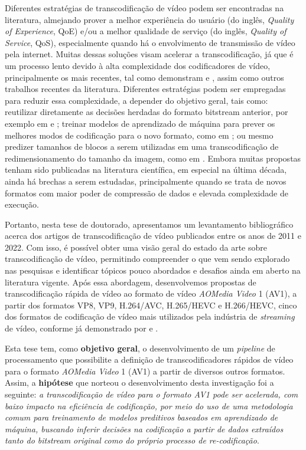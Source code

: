 Diferentes estratégias de transcodificação de vídeo podem ser encontradas na literatura, almejando prover a melhor experiência do usuário (do inglês, \textit{Quality of Experience}, QoE) e/ou a melhor qualidade de serviço (do inglês, \textit{Quality of Service}, QoS), especialmente quando há o envolvimento de transmissão de vídeo pela internet. Muitas dessas soluções visam acelerar a transcodificação, já que é um processo lento devido à alta complexidade dos codificadores de vídeo, principalmente os mais recentes, tal como demonstram \citet{bib:hevc_complexity} e \citet{bib:vvc_complexity}, assim como outros trabalhos recentes da literatura. Diferentes estratégias podem ser empregadas para reduzir essa complexidade, a depender do objetivo geral, tais como: reutilizar diretamente as decisões herdadas do formato bitstream anterior, por exemplo em \citet{bib:wang_2012} e \citet{bib:nguyen_2015}; treinar modelos de aprendizado de máquina para prever os melhores modos de codificação para o novo formato, como em \citet{bib:peixoto_2014}; ou mesmo predizer tamanhos de blocos a serem utilizadas em uma transcodificação de redimensionamento do tamanho da imagem, como em \citet{bib:lin_2016}. Embora muitas propostas tenham sido publicadas na literatura científica, em especial na última década, ainda há brechas a serem estudadas, principalmente quando se trata de novos formatos com maior poder de compressão de dados e elevada complexidade de execução.

Portanto, nesta tese de doutorado, apresentamos um levantamento bibliográfico acerca dos artigos de transcodificação de vídeo publicados entre os anos de 2011 e 2022. Com isso, é possível obter uma visão geral do estado da arte sobre transcodificação de vídeo, permitindo compreender o que vem sendo explorado nas pesquisas e identificar tópicos pouco abordados e desafios ainda em aberto na literatura vigente. Após essa abordagem, desenvolvemos propostas de transcodificação rápida de vídeo ao formato de vídeo \textit{AOMedia Video} 1 (AV1), a partir dos formatos VP8, VP9, H.264/AVC, H.265/HEVC e H.266/HEVC, cinco dos formatos de codificação de vídeo mais utilizados pela indústria de \textit{streaming} de vídeo, conforme já demonstrado por \citet{bib:bitmovin_report_2021} e \citet{bib:bitmovin_report_2022}.

Esta tese tem, como \textbf{objetivo geral}, o desenvolvimento de um \textit{pipeline} de processamento que possibilite a definição de transcodificadores rápidos de vídeo para o formato \textit{AOMedia Video} 1 (AV1) a partir de diversos outros formatos. Assim, a \textbf{hipótese} que norteou o desenvolvimento desta investigação foi a seguinte: \textit{a transcodificação de vídeo para o formato AV1 pode ser acelerada, com baixo impacto na eficiência de codificação, por meio do uso de uma metodologia comum para treinamento de modelos preditivos baseados em aprendizado de máquina, buscando inferir decisões na codificação a partir de dados extraídos tanto do bitstream original como do próprio processo de re-codificação}.

